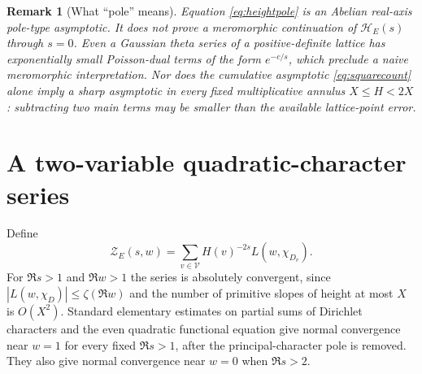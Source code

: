 \documentclass[11pt]{article}
\newtheorem{remark}[theorem]{Remark}
\newcommand{\calV}{\mathcal{V}}
\begin{document}
\begin{remark}[What ``pole'' means]\label{rem:notmero}
Equation \eqref{eq:heightpole} is an \emph{Abelian real-axis pole-type asymptotic}.  It does \emph{not} prove a meromorphic continuation of $\mathcal H_E(s)$ through $s=0$.  Even a Gaussian theta series of a positive-definite lattice has exponentially small Poisson-dual terms of the form $e^{-c/s}$, which preclude a naive meromorphic interpretation.  Nor does the cumulative asymptotic \eqref{eq:squarecount} alone imply a sharp asymptotic in every fixed multiplicative annulus $X\le H<2X$: subtracting two main terms may be smaller than the available lattice-point error.
\end{remark}

\section{A two-variable quadratic-character series}
Define
\begin{equation}\label{eq:two-variable}
 \mathcal Z_E(s,w)=\sum_{v\in\calV}H(v)^{-2s}L(w,\chi_{D_v}).
\end{equation}
For $\Re s>1$ and $\Re w>1$ the series is absolutely convergent, since $|L(w,\chi_D)|\le\zeta(\Re w)$ and the number of primitive slopes of height at most $X$ is $O(X^2)$.  Standard elementary estimates on partial sums of Dirichlet characters and the even quadratic functional equation give normal convergence near $w=1$ for every fixed $\Re s>1$, after the principal-character pole is removed.  They also give normal convergence near $w=0$ when $\Re s>2$.
\end{document}

